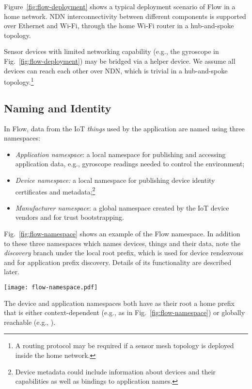 Figure~\ref{fig:flow-deployment} shows a typical deployment scenario of Flow in a home network.  NDN interconnectivity between different components is supported over Ethernet and Wi-Fi, through the home Wi-Fi router in a hub-and-spoke topology. 

Sensor devices with limited networking capability (e.g., the gyroscope in Fig.~\ref{fig:flow-deployment}) may be bridged via a helper device.
We assume all devices can reach each other over NDN, which is trivial in a hub-and-spoke topology.\footnote{A routing protocol may be required if a sensor mesh topology is deployed inside the home network.}

\subsection{Naming and Identity}
\label{sec:naming}

In Flow, data from the IoT \textit{things} used by the application are named using three namespaces:
\begin{itemize}
\item \emph{Application namespace}: a local namespace for publishing and accessing application data, e.g., gyroscope readings needed to control the environment; 
\item \emph{Device namespace:} a local namespace for publishing device identity certificates and metadata;\footnote{Device metadata could include information about devices and their capabilities as well as bindings to application names.}
\item \emph{Manufacturer namespace}: a global namespace created by the IoT device vendors and for trust bootstrapping.
\end{itemize}


Fig.~\ref{fig:flow-namespace} shows an example of the Flow namespace.  In addition to these three namespaces which names devices, things and their data, note the \textit{discovery} branch under the local root prefix, which is used for device rendezvous and for application prefix discovery. Details of its functionality are described later.


\begin{figure*}[!t]
\centering
\texttt{[image: flow-namespace.pdf]}
\caption{Example namespace within the home environment where Flow is deployed.}
\label{fig:flow-namespace}
\end{figure*}

The device and application namespaces both have as their root a home prefix that is either context-dependent (e.g.,  as in Fig.~\ref{fig:flow-namespace}) or globally reachable (e.g., ).


